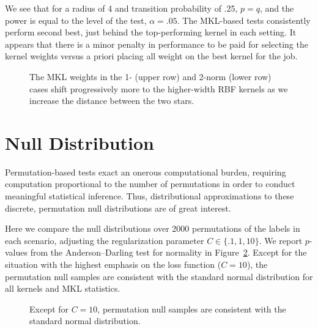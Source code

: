 We see that for a radius of 4 and transition probability of .25, $p=q$, and the power
is equal to the level of the test, $\alpha = .05$.  The MKL-based tests consistently
perform second best, just behind the top-performing kernel in each setting.  It appears
that there is a minor penalty in performance to be paid for selecting the kernel
weights versus a priori placing all weight on the best kernel for the job.
\begin{figure}
  \begin{center}
    \resizebox{14.0cm}{!}{
      
    }
  \end{center}
\caption{The MKL weights in the 1- (upper row) and 2-norm (lower row) cases shift progressively more to
  the higher-width RBF kernels as we increase the distance between the two stars.}
\label{fig:mkl_power}
\end{figure}

\section{Null Distribution}
Permutation-based tests exact an onerous computational burden, requiring computation
proportional to the number of permutations in order to conduct meaningful statistical
inference.  Thus, distributional approximations to these discrete, permutation null
distributions are of great interest.

Here we compare the null distributions over 2000 permutations of the labels in each scenario,
adjusting the regularization parameter $C \in \{.1, 1, 10\}$.  We report $p$-values
from the Anderson--Darling test for normality in Figure~\ref{fig:mkl_null}.  Except for
the situation with the highest emphasis on the loss function ($C=10$), the
permutation null samples are consistent with the standard normal distribution for all kernels
and MKL statistics.
\begin{figure}
  \begin{center}
    \resizebox{14.0cm}{!}{
      
    }
  \end{center}
\caption{Except for $C=10$, permutation null samples are consistent with the standard normal distribution.}
\label{fig:mkl_null}
\end{figure}